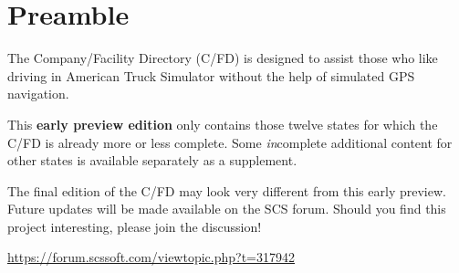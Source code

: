 \maketitle

\vspace{5mm}
\section*{Preamble}

{
\justifying

The Company/Facility Directory (C/FD) is designed to assist those who like driving in American Truck Simulator without the help of simulated GPS navigation.

This \textbf{early preview edition} only contains those twelve states for which the C/FD is already more or less complete.
Some \emph{in}complete additional content for other states is available separately as a supplement.

The final edition of the C/FD may look very different from this early preview.
Future updates will be made available on the SCS forum.
Should you find this project interesting, please join the discussion!

\centering \vspace{1ex}
\url{https://forum.scssoft.com/viewtopic.php?t=317942} \par
}

\copyrightblock
\thispagestyle{empty}

\tableofcontents
\thispagestyle{empty}
